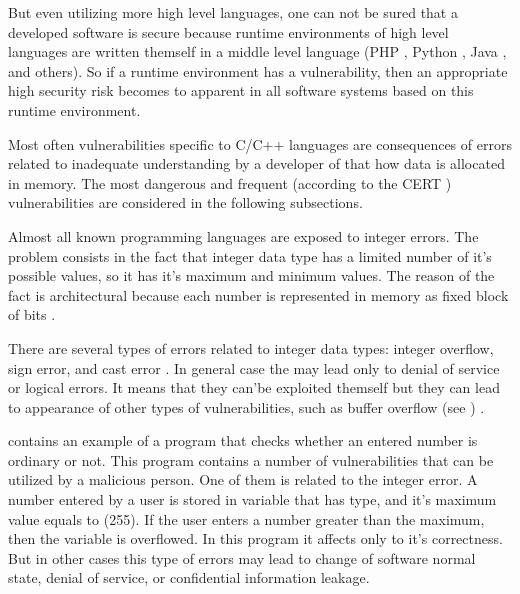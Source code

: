 %
But even utilizing more high level languages, one can not be sured that a developed software is secure because runtime environments of high level languages are written themself in a middle level language (PHP , Python , Java , and others). 
%
So if a runtime environment has a vulnerability, then an appropriate high security risk becomes to apparent in all software systems based on this runtime environment. 

%
Most often vulnerabilities specific to C/C++ languages are consequences of errors related to inadequate understanding by a developer of that how data is allocated in memory. 
%
The most dangerous and frequent (according to the CERT ) vulnerabilities are considered in the following subsections. 



%
Almost all known programming languages are exposed to integer errors. 
%
The problem consists in the fact that integer data type has a limited number of it's possible values, so it has it's maximum and minimum values. 
%
The reason of the fact is architectural because each number is represented in memory as fixed block of bits . 

%
There are several types of errors related to integer data types: integer overflow, sign error, and cast error     . 
%
In general case the may lead only to denial of service or logical errors. 
%
It means that they can'be exploited themself but they can lead to appearance of other types of vulnerabilities, such as buffer overflow (see ) . 

%
 contains an example of a program that checks whether an entered number is ordinary or not. 
%
This program contains a number of vulnerabilities that can be utilized by a malicious person. 
%
One of them is related to the integer error. 
%
A number entered by a user is stored in  variable that has  type, and it's maximum value equals to  (255). 
%
If the user enters a number greater than the maximum, then the  variable is overflowed. 
%
In this program it affects only to it's correctness. 
%
But in other cases this type of errors may lead to change of software normal state, denial of service, or confidential information leakage. 

